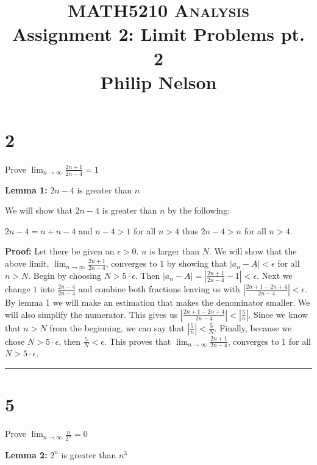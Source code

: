 \documentclass[12pt]{article}
\newcommand\qedsym{\hfill \rule{2mm}{2mm}}
\begin{document}
\baselineskip=14.0pt

\title{MATH5210 \textsc{Analysis}
  \\ Assignment 2: Limit Problems pt. 2
  \\ Philip Nelson
}
\date{}

\maketitle

\vspace{-0.5in}

\section*{2}
Prove $\lim_{n\to \infty}\frac{2n+1}{2n-4} = 1$

\bigskip

\textbf{Lemma 1:} $2n-4$ is greater than $n$

We will show that $2n-4$ is greater than $n$ by the following:

$2n-4 = n + n - 4$ and $n - 4 > 1$ for all $n > 4$ thus $2n - 4 > n$ for all $n > 4$.

\bigskip

\textbf{Proof:} Let there be given an $\epsilon > 0$. $n$ is larger than $N$. We will show that the above limit, $\lim_{n\to \infty}\frac{2n+1}{2n-4}$, converges to $1$ by showing that $|a_n - A| < \epsilon$ for all $n > N$. Begin by choosing $N > 5 \cdot \epsilon$. Then $|a_n - A| = |\frac{2n+1}{2n-4} - 1 | < \epsilon$. Next we change $1$ into $\frac{2n-4}{2n-4}$ and combine both fractions leaving us with $|\frac{2n+1-2n+4}{2n-4}| < \epsilon$. By lemma 1 we will make an estimation that makes the denominator smaller. We will also simplify the numerator. This gives us $|\frac{2n+1-2n+4}{2n-4}| < |\frac{5}{n}|$. Since we know that $n > N$ from the beginning, we can say that $|\frac{5}{n}| < \frac{5}{N}$. Finally, because we chose $N > 5 \cdot \epsilon$, then $\frac{5}{N} < \epsilon$. This proves that $\lim_{n\to \infty}\frac{2n+1}{2n-4}$, converges to $1$ for all $N > 5\cdot \epsilon$. \qedsym{}

\section*{5}
Prove $\lim_{n\to \infty}\frac{n}{2^n} = 0$

\bigskip

\textbf{Lemma 2:} $2^n$ is greater than $n^3$
\end{document}
